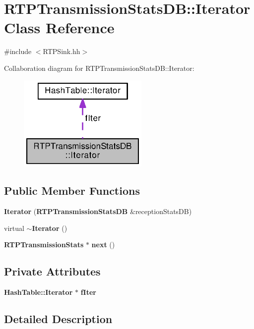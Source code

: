 \section{R\+T\+P\+Transmission\+Stats\+D\+B\+:\+:Iterator Class Reference}
\label{classRTPTransmissionStatsDB_1_1Iterator}


{\ttfamily \#include $<$R\+T\+P\+Sink.\+hh$>$}



Collaboration diagram for R\+T\+P\+Transmission\+Stats\+D\+B\+:\+:Iterator\+:
\nopagebreak
\begin{figure}[H]
\begin{center}
\leavevmode
\includegraphics[width=178pt]{classRTPTransmissionStatsDB_1_1Iterator__coll__graph}
\end{center}
\end{figure}
\subsection*{Public Member Functions}
\begin{DoxyCompactItemize}
\item 
{\bf Iterator} ({\bf R\+T\+P\+Transmission\+Stats\+D\+B} \&reception\+Stats\+D\+B)
\item 
virtual {\bf $\sim$\+Iterator} ()
\item 
{\bf R\+T\+P\+Transmission\+Stats} $\ast$ {\bf next} ()
\end{DoxyCompactItemize}
\subsection*{Private Attributes}
\begin{DoxyCompactItemize}
\item 
{\bf Hash\+Table\+::\+Iterator} $\ast$ {\bf f\+Iter}
\end{DoxyCompactItemize}


\subsection{Detailed Description}


